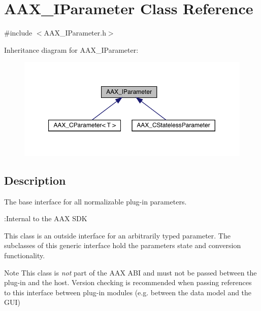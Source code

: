 \hypertarget{a01857}{}\section{A\+A\+X\+\_\+\+I\+Parameter Class Reference}
\label{a01857}


{\ttfamily \#include $<$A\+A\+X\+\_\+\+I\+Parameter.\+h$>$}



Inheritance diagram for A\+A\+X\+\_\+\+I\+Parameter\+:
\nopagebreak
\begin{figure}[H]
\begin{center}
\leavevmode
\includegraphics[width=350pt]{a01856}
\end{center}
\end{figure}


\subsection{Description}
The base interface for all normalizable plug-\/in parameters. 

\begin{DoxyRefDesc}{\+:\+Internal to the A\+A\+X S\+DK}
\item[\mbox{\hyperlink{a00792__aax_sdk_internal000002}{\+:\+Internal to the A\+A\+X S\+DK}}]\end{DoxyRefDesc}


This class is an outside interface for an arbitrarily typed parameter. The subclasses of this generic interface hold the parameter\textquotesingle{}s state and conversion functionality.

\begin{DoxyNote}{Note}
This class is {\itshape not} part of the A\+AX A\+BI and must not be passed between the plug-\/in and the host. Version checking is recommended when passing references to this interface between plug-\/in modules (e.\+g. between the data model and the G\+UI) 
\end{DoxyNote}
